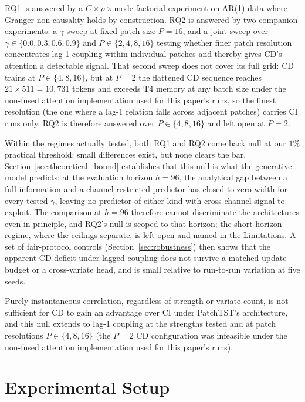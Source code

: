 \documentclass[10pt]{article} %
\begin{document}
    RQ1 is answered by a $C \times \rho \times \text{mode}$ factorial experiment on AR(1) data where Granger non-causality
    holds by construction. RQ2 is answered by two companion experiments: a $\gamma$ sweep at fixed patch size $P = 16$, and
    a joint sweep over $\gamma \in \{0.0, 0.3, 0.6, 0.9\}$ and $P \in \{2, 4, 8, 16\}$ testing whether finer patch
    resolution concentrates lag-1 coupling within individual patches and thereby gives CD's attention a detectable signal.
    That second sweep does not cover its full grid: CD trains at $P \in \{4, 8, 16\}$, but at $P = 2$ the flattened CD sequence
    reaches $21 \times 511 = 10{,}731$ tokens and exceeds T4 memory at any batch size under the non-fused attention
    implementation used for this paper's runs, so the finest resolution (the one
    where a lag-1 relation falls across adjacent patches) carries CI runs only. RQ2 is therefore answered over
    $P \in \{4, 8, 16\}$ and left open at $P = 2$.

    Within the regimes actually tested, both RQ1 and RQ2 come back null at our $1\%$ practical threshold: small differences
    exist, but none clears the bar. Section~\ref{sec:theoretical_bound} establishes that this null is what the generative
    model predicts: at the evaluation horizon $h = 96$, the analytical gap between a full-information and a channel-restricted
    predictor has closed to zero width for every tested $\gamma$, leaving no predictor of either kind with cross-channel signal
    to exploit. The comparison at $h = 96$ therefore cannot discriminate the architectures even in principle, and RQ2's null
    is scoped to that horizon; the short-horizon regime, where the ceilings separate, is left open and named in the Limitations.
    A set of fair-protocol controls (Section~\ref{sec:robustness}) then shows that the apparent CD deficit under lagged coupling
    does not survive a matched update budget or a cross-variate head, and is small relative to run-to-run variation at five seeds.

    Purely instantaneous correlation, regardless of strength or variate count, is not sufficient for CD to gain an advantage over
    CI under PatchTST's architecture, and this null extends to lag-1 coupling at the strengths tested and at patch resolutions
    $P \in \{4, 8, 16\}$ (the $P = 2$ CD configuration was infeasible under the non-fused attention implementation used for this paper's runs).


    \section{Experimental Setup}
    \label{sec:setup}
\end{document}
